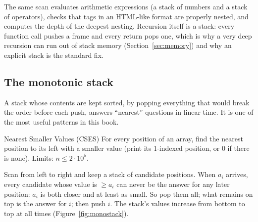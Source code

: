 The same scan evaluates arithmetic expressions (a stack of numbers and a stack of operators), checks that tags in an HTML-like
format are properly nested, and computes the depth of the deepest nesting. Recursion itself is a stack: every function call
pushes a frame and every return pops one, which is why a very deep recursion can run out of stack memory
(Section~\ref{sec:memory}) and why an explicit stack is the standard fix.

\subsection{The monotonic stack}

A stack whose contents are kept sorted, by popping everything that would break the order before each push, answers
``nearest'' questions in linear time. It is one of the most useful patterns in this book.

\begin{problem}{Nearest Smaller Values (CSES)}
For every position of an array, find the nearest position to its left with a smaller value (print its 1-indexed position,
or 0 if there is none). Limits: $n \le 2 \cdot 10^5$.
\end{problem}

Scan from left to right and keep a stack of candidate positions. When $a_i$ arrives, every candidate whose value is
$\ge a_i$ can never be the answer for any later position: $a_i$ is both closer and at least as small. So pop them all; what
remains on top is the answer for $i$; then push $i$. The stack's values increase from bottom to top at all times
(Figure~\ref{fig:monostack}).

